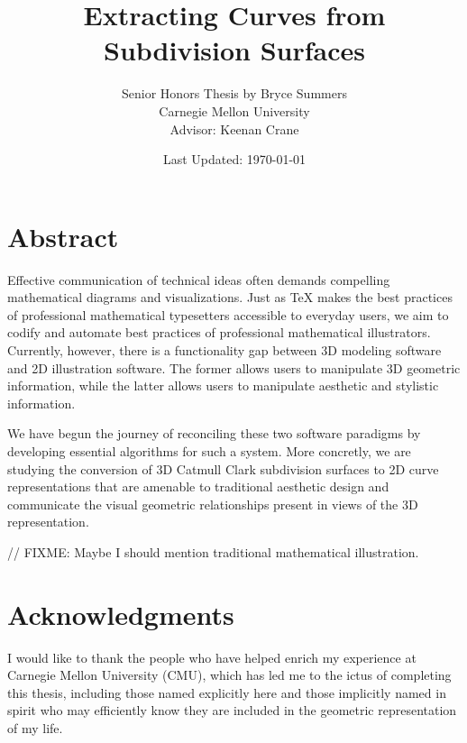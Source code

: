 \documentclass[12pt, letterpaper]{article}
\begin{document}
\doublespacing

\title{\color{blue}Extracting Curves from Subdivision Surfaces}
\author{Senior Honors Thesis by Bryce Summers \\
Carnegie Mellon University\\
Advisor: Keenan Crane}
\date{\color{red}Last Updated: \today}
\maketitle



\newpage

\section*{Abstract}

	Effective communication of technical ideas often demands compelling mathematical diagrams and visualizations. 
	Just as TeX makes the best practices of professional mathematical typesetters accessible to everyday users,
	we aim to codify and automate best practices of professional mathematical illustrators.
	Currently, however, there is a functionality gap between 3D modeling software and 2D illustration software.
	The former allows users to manipulate 3D geometric information, while the latter allows users to manipulate aesthetic and stylistic information.

	We have begun the journey of reconciling these two software paradigms by developing essential algorithms for such a system. More concretly, we are 			studying the conversion of 3D Catmull Clark subdivision surfaces to 2D curve representations that are amenable to traditional aesthetic design and 			communicate the visual geometric relationships present in views of the 3D representation.

	// FIXME: Maybe I should mention traditional mathematical illustration.

\newpage

\section*{Acknowledgments}
\singlespacing

I would like to thank the people who have helped enrich my experience at Carnegie Mellon University (CMU),
which has led me to the ictus of completing this thesis, including those named explicitly here  and
those implicitly named in spirit who may efficiently know they are included in the geometric representation of my life.
\end{document}
